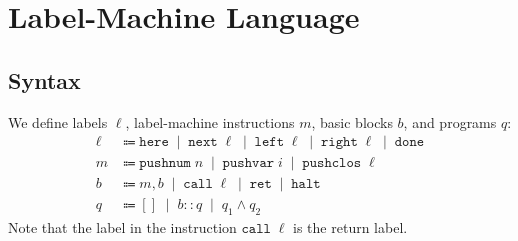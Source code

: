 \documentclass[12pt]{article}
\newcommand{\alt}{\;\; | \;\;}
\newcommand{\defi}{\Coloneqq}
\newcommand{\nil}{[]}
\newcommand{\h}[1]{\hat{#1}}
\renewcommand{\rule}{\textsc}
\newcommand{\sg}{\sigma}
\renewcommand{\P}{\mathcal{P}}
\newcommand{\n}[1]{\overline{#1}}
\newcommand{\cl}[2]{\{ #1 ; #2 \}}
\newcommand{\mpushnum}[1]{\mathtt{pushnum} \; #1}
\newcommand{\mhalt}{\mathtt{halt}}
\newcommand{\mpushvar}[1]{\mathtt{pushvar} \; #1}
\newcommand{\mpushclos}[1]{\mathtt{pushclos} \; #1}
\newcommand{\mcall}[1]{\mathtt{call} \; #1}
\newcommand{\mret}{\mathtt{ret}}
\newcommand{\lhere}{\mathtt{here}}
\newcommand{\lnext}{\mathtt{next}}
\newcommand{\lleft}{\mathtt{left}}
\newcommand{\lright}{\mathtt{right}}
\newcommand{\ldone}{\mathtt{done}}
\newcommand{\judgement}[1]{\noindent \framebox{#1}}
\newcommand{\ninf}[1]{\AxiomC{#1}}
\newcommand{\uinf}[1]{\UnaryInfC{#1}}
\newcommand{\binf}[1]{\BinaryInfC{#1}}
\newcommand{\ax}[1]{\ninf{} \uinf{#1}}
\newcommand{\leftl}[1]{\LeftLabel{#1\;}}
\newcommand{\tr}[2]{\ensuremath{#1 \rhd #2}}
\newcommand{\tracc}[3]{\ensuremath{#1 \circ #2 \rhd #3}}
\newcommand{\hev}[3]{\ensuremath{#1 \vdash #2 \Downarrow #3}}
\newcommand{\ssev}[4]{\ensuremath{\langle #1; #2 \rangle \rightarrow^* \langle #3; #4 \rangle}}
\newcommand{\fr}[2]{\langle #1; #2 \rangle}
\newcommand{\cor}[2]{\ensuremath{#1 \rightsquigarrow #2}}
\newcommand{\scomp}{\cor}
\newcommand{\e}{e} %
\renewcommand{\b}{b} %
\renewcommand{\v}{v} %
\newcommand{\s}{s}
\renewcommand{\ss}{p} %
\newcommand{\w}{w}
\newcommand{\q}{q}
\newcommand{\m}{m}
\renewcommand{\h}{h}
\renewcommand{\l}{\ell}
\newcommand{\mnil}{[]}
\newcommand{\mcons}{::}
\newcommand{\mnode}{\wedge}
\newcounter{statementcounter}
\newtheorem{lemma}[statementcounter]{Lemma}
\begin{document}
%
%
%
%
%
%
%

\section*{Label-Machine Language}

\subsection*{Syntax}

We define labels $\l$, label-machine instructions $\m$, basic blocks $\b$, and programs $\q$:
\begin{align*}
  \l &\defi \lhere \alt \lnext \; \l \alt \lleft \; \l \alt \lright \; \l \alt \ldone \\
  \m &\defi \mpushnum{n} \alt \mpushvar{i} \alt \mpushclos{\l} \\
  \b &\defi \m, \b \alt \mcall{\l} \alt \mret \alt \mhalt \\
  \q &\defi \mnil \alt \b \mcons \q \alt \q_1 \mnode \q_2
\end{align*}
Note that the label in the instruction $\mcall{\l}$ is the return label.
\end{document}
